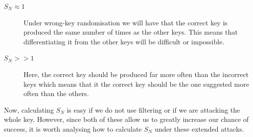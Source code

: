 \documentclass[12pt,a4paper]{article}
\begin{document}
\begin{description}
    \item [$S_N \approx 1$] Under wrong-key randomisation we will have
    that the correct key is produced the same number of times as the other
    keys. This means that differentiating it from the other keys will be
    difficult or impossible.
    \item [$S_N >> 1$] Here, the correct key should be produced far more often
    than the incorrect keys which means that it the correct key should be the
    one suggested more often than the others.
\end{description}

Now, calculating $S_N$ is easy if we do not use filtering or if we are attacking
the whole key. However, since both of these allow us to greatly increase our
chance of success, it is worth analysing how to calculate $S_N$ under these
extended attacks.
\end{document}
